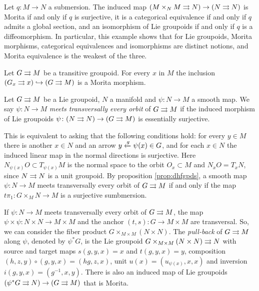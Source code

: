 \begin{example}
Let $q\colon M\to N$ a submersion.
The induced map $(M\times_N M\rightrightarrows N)\to (N\rightrightarrows N)$ is Morita if and only if $q$ is surjective, it is a categorical equivalence if and only if $q$ admits a global section, and an isomorphism of Lie groupoids if and only if $q$ is a diffeomorphism.
In particular, this example shows that for Lie groupoids, Morita morphisms, categorical equivalences and isomorphisms are distinct notions, and Morita equivalence is the weakest of the three.
\end{example}

\begin{example}
Let $G\rightrightarrows M$ be a transitive groupoid.
For every $x$ in $M$ the inclusion
$(G_x\rightrightarrows x) \hookrightarrow (G\rightrightarrows M)$
is a Morita morphism.
\end{example}

Let $G\rightrightarrows M$ be a Lie groupoid, $N$ a manifold and $\psi\colon N\to M$ a smooth map.
We say $\psi\colon N\to M$ \emph{meets transversally every orbit} of $G\rightrightarrows M$ if
the induced morphism of Lie groupoids $\psi\colon (N\rightrightarrows N)\to (G\rightrightarrows M)$ is essentially surjective.

This  is equivalent to asking that the following conditions hold: for every $y\in M$ there is another $x\in N$ and an arrow $\smash{y\xleftarrow{g}\psi(x)}\in G$, and for each $x\in N$ the induced linear map in the normal directions  is surjective.
Here $N_{\psi(x)}O \subset T_{\psi(x)}M$ is the normal space to the orbit $O_x\subset M$ and $N_xO=T_xN$, since $N\rightrightarrows N$ is a unit groupoid.
By proposition \ref{prop:dhfgpds}, a smooth map $\psi\colon N\to M$ meets transversally every orbit of $G\rightrightarrows M$ if and only if the map $t\pi_1\colon G\times_M N\to M$ is a surjective sumbmersion.

If $\psi\colon N\to M$ meets transversally every orbit of $G\rightrightarrows M$, the map $\psi\times\psi\colon N\times N\to M\times M$ and the anchor $(t,s)\colon G\to M\times M$ are transversal.
So, we can consider the fiber product $G\times_{M\times M} (N\times N)$.
The \emph{pull-back} of $G\rightrightarrows M$ along $\psi$, denoted by $\psi^*G$, is the Lie groupoid
\( G\times_{M\times M} (N\times N) \rightrightarrows N \)
with source and target maps $s(g,y,x) = x$ and $t(g,y,x) = y$, composition $(h,z,y)\circ(g,y,x) = (hg,z,x)$, unit $u(x) = (u_{\psi(x)},x,x)$ and inversion $i(g,y,x) = (g^{-1},x,y)$.
There is also an induced map of Lie groupoids
\( (\psi^*G\rightrightarrows N) \to (G\rightrightarrows M) \)
that is Morita.

